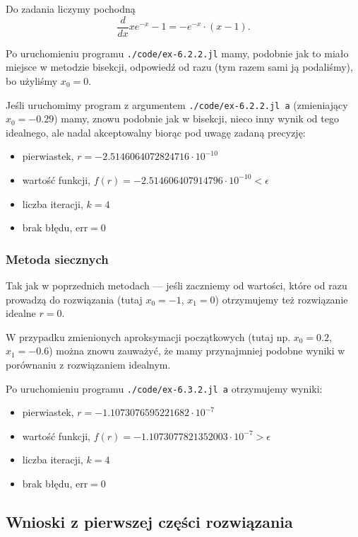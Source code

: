 \documentclass[10pt]{article}
\begin{document}
Do zadania liczymy pochodną
$$
\frac{d}{dx} xe^{-x} - 1 = -e^{-x} \cdot (x - 1).
$$

Po uruchomieniu programu \texttt{./code/ex-6.2.2.jl} mamy, podobnie jak to miało miejsce w metodzie bisekcji, odpowiedź od razu (tym razem sami ją podaliśmy), bo użyliśmy $x_0 = 0$.

Jeśli uruchomimy program z argumentem \texttt{./code/ex-6.2.2.jl a} (zmieniający $x_0 = -0.29$) mamy, znowu podobnie jak w bisekcji, nieco inny wynik od tego idealnego, ale nadal akceptowalny biorąc pod uwagę zadaną precyzję:
\begin{itemize}
    \item pierwiastek, $r = -2.5146064072824716 \cdot 10^{-10}$
    \item wartość funkcji, $f(r) = -2.514606407914796 \cdot 10^{-10} < \epsilon$
    \item liczba iteracji, $k = 4$
    \item brak błędu, $\mathrm{err} = 0$
\end{itemize}

\subsubsection{Metoda siecznych}

Tak jak w poprzednich metodach — jeśli zaczniemy od wartości, które od razu prowadzą do rozwiązania (tutaj $x_0 = -1$, $x_1 = 0$) otrzymujemy też rozwiązanie idealne $r = 0$.

W przypadku zmienionych aproksymacji początkowych (tutaj np. $x_0 = 0.2$, $x_1 = -0.6$) można znowu zauważyć, że mamy przynajmniej podobne wyniki w porównaniu z rozwiązaniem idealnym.

\noindent Po uruchomieniu programu \texttt{./code/ex-6.3.2.jl a} otrzymujemy wyniki:
\begin{itemize}
    \item pierwiastek, $r = -1.1073076595221682 \cdot 10^{-7}$
    \item wartość funkcji, $f(r) = -1.1073077821352003 \cdot 10^{-7} > \epsilon$
    \item liczba iteracji, $k = 4$
    \item brak błędu, $\mathrm{err} = 0$
\end{itemize}

\subsection{Wnioski z pierwszej części rozwiązania}
\end{document}
